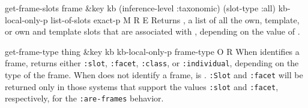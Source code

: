 \begin{okbcop}{get-frame-slots}{ frame \&key kb (inference-level :taxonomic) (slot-type :all) kb-local-only-p} { list-of-slots exact-p } { M } { R } { E }
Returns , a list of all the own, template, or own
   and template slots that are associated with , depending on the
   value of .
\end{okbcop}

\begin{okbcop}{get-frame-type}{ thing \&key kb kb-local-only-p} { frame-type } { O } { R } {  }
When  identifies a frame, returns either
   {\tt :slot}, {\tt :facet}, {\tt :class}, or {\tt :individual},
   depending on the type of the frame.
   When  does not identify a frame,  is 
   \false.  {\tt :Slot} and {\tt :facet} will be returned only in
   those systems that support the values {\tt :slot} and {\tt :facet},
   respectively, for the {\tt :are-frames} behavior.
\end{okbcop}

